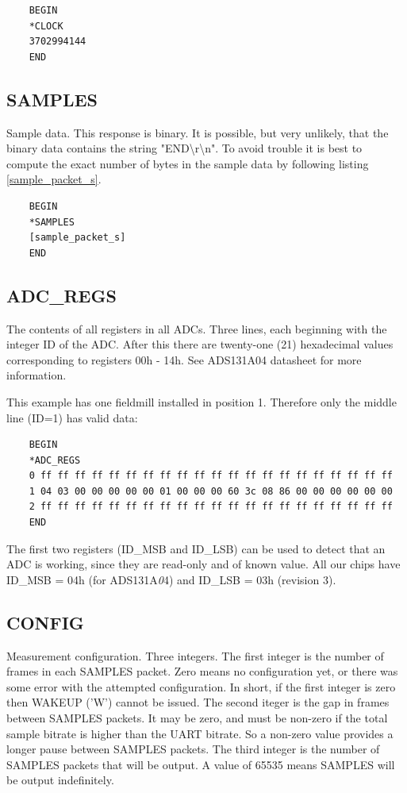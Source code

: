 \documentclass{article}
\begin{document}
\begin{lstlisting}
    BEGIN
    *CLOCK
    3702994144
    END
\end{lstlisting}

\subsection{SAMPLES}

Sample data.
This response is binary.
It is possible, but very unlikely, that the binary data contains the string "END{\textbackslash}r{\textbackslash}n".
To avoid trouble it is best to compute the exact number of bytes in the sample data by following listing \vref{sample_packet_s}.

\begin{lstlisting}
    BEGIN
    *SAMPLES
    [sample_packet_s]
    END
\end{lstlisting}

\subsection{ADC\_REGS}

The contents of all registers in all ADCs.
Three lines, each beginning with the integer ID of the ADC.
After this there are twenty-one (21) hexadecimal values corresponding to registers 00h - 14h.
See ADS131A04 datasheet for more information.

This example has one fieldmill installed in position 1.
Therefore only the middle line (ID=1) has valid data:

\begin{lstlisting}
    BEGIN
    *ADC_REGS
    0 ff ff ff ff ff ff ff ff ff ff ff ff ff ff ff ff ff ff ff ff ff
    1 04 03 00 00 00 00 00 01 00 00 00 60 3c 08 86 00 00 00 00 00 00
    2 ff ff ff ff ff ff ff ff ff ff ff ff ff ff ff ff ff ff ff ff ff
    END
\end{lstlisting}

The first two registers (ID\_MSB and ID\_LSB) can be used to detect that an ADC is working,
since they are read-only and of known value.
All our chips have ID\_MSB = 04h (for ADS131A{\emph 04}) and ID\_LSB = 03h (revision 3).

\subsection{CONFIG}

Measurement configuration. Three integers.
The first integer is the number of frames in each SAMPLES packet.
Zero means no configuration yet, or there was some error with the attempted configuration.
In short, if the first integer is zero then WAKEUP ('W') cannot be issued.
The second iteger is the gap in frames between SAMPLES packets.
It may be zero, and must be non-zero if the total sample bitrate is higher than the UART bitrate.
So a non-zero value provides a longer pause between SAMPLES packets.
The third integer is the number of SAMPLES packets that will be output.
A value of 65535 means SAMPLES will be output indefinitely.
\end{document}
